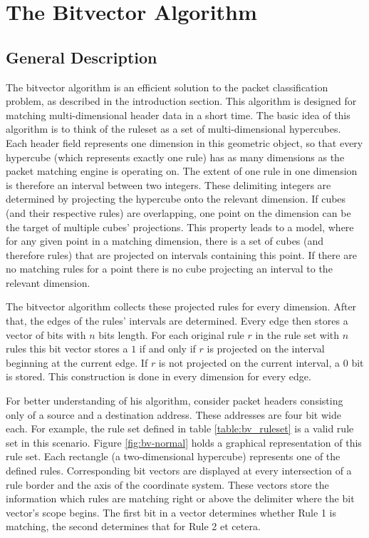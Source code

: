 \documentclass[a4paper,
		12pt,
		parskip=full,
		titlepage
		]{scrartcl}
\begin{document}
\section{The Bitvector Algorithm}
\subsection{General Description}
The bitvector algorithm \cite{bv} is an efficient solution to the packet classification problem, as described in the introduction section.
This algorithm is designed for matching multi-dimensional header data in a short time.
The basic idea of this algorithm is to think of the ruleset as a set of multi-dimensional hypercubes.
Each header field represents one dimension in this geometric object, so that every hypercube (which represents exactly one rule) has as many dimensions as the packet matching engine is operating on.
The extent of one rule in one dimension is therefore an interval between two integers.
These delimiting integers are determined by projecting the hypercube onto the relevant dimension.
If cubes (and their respective rules) are overlapping, one point on the dimension can be the target of multiple cubes' projections. 
This property leads to a model, where for any given point in a matching dimension, there is a set of cubes (and therefore rules) that are projected on intervals containing this point.
If there are no matching rules for a point there is no cube projecting an interval to the relevant dimension.

The bitvector algorithm collects these projected rules for every dimension.
After that, the edges of the rules' intervals are determined.
Every edge then stores a vector of bits with $n$ bits length.
For each original rule $r$ in the rule set with $n$ rules this bit vector stores a $1$ if and only if $r$ is projected on the interval beginning at the current edge.
If $r$ is not projected on the current interval, a $0$ bit is stored.
This construction is done in every dimension for every edge.

For better understanding of his algorithm, consider packet headers consisting only of a source and a destination address.
These addresses are four bit wide each.
For example, the rule set defined in table \ref{table:bv_ruleset} is a valid rule set in this scenario.
Figure \ref{fig:bv-normal} holds a graphical representation of this rule set.
Each rectangle (a two-dimensional hypercube) represents one of the defined rules.
Corresponding bit vectors are displayed at every intersection of a rule border and the axis of the coordinate system.
These vectors store the information which rules are matching right or above the delimiter where the bit vector's scope begins.
The first bit in a vector determines whether Rule 1 is matching, the second determines that for Rule 2 et cetera.
\end{document}

